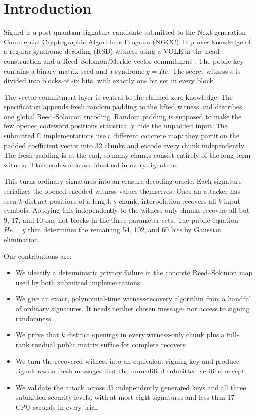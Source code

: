 \documentclass[11pt,a4paper]{article}
\begin{document}
\section{Introduction}

Sigurd is a post-quantum signature candidate submitted to the
Next-generation Commercial Cryptographic Algorithms Program (NGCC).  It proves
knowledge of a regular-syndrome-decoding (RSD) witness using a
VOLE-in-the-head construction and a Reed--Solomon/Merkle vector commitment
\cite{Sigurd}.  The public key contains a binary matrix seed and a syndrome
$y=He$.  The secret witness $e$ is divided into blocks of six bits, with
exactly one bit set in every block.

The vector-commitment layer is central to the claimed zero knowledge.  The
specification appends fresh random padding to the lifted witness and describes
one global Reed--Solomon encoding.  Random padding is supposed to make the few
opened codeword positions statistically hide the unpadded input.  The
submitted C implementations use a different concrete map: they partition the
padded coefficient vector into 32 chunks and encode every chunk independently.
The fresh padding is at the end, so many chunks consist entirely of the
long-term witness.  Their codewords are identical in every signature.

This turns ordinary signatures into an erasure-decoding oracle.  Each
signature serializes the opened encoded-witness values themselves.  Once an
attacker has seen $k$ distinct positions of a length-$s$ chunk, interpolation
recovers all $k$ input symbols.  Applying this independently to the
witness-only chunks recovers all but 9, 17, and 10 one-hot blocks in the three
parameter sets.  The public equation $He=y$ then determines the remaining 54,
102, and 60 bits by Gaussian elimination.

Our contributions are:

\begin{itemize}[leftmargin=1.5em]
  \item We identify a deterministic privacy failure in the concrete
        Reed--Solomon map used by both submitted implementations.
  \item We give an exact, polynomial-time witness-recovery algorithm from a
        handful of ordinary signatures.  It needs neither chosen messages nor
        access to signing randomness.
  \item We prove that $k$ distinct openings in every witness-only chunk plus a
        full-rank residual public matrix suffice for complete recovery.
  \item We turn the recovered witness into an equivalent signing key and
        produce signatures on fresh messages that the unmodified submitted
        verifiers accept.
  \item We validate the attack across 35 independently generated keys and all
        three submitted security levels, with at most eight signatures and
        less than 17 CPU-seconds in every trial.
\end{itemize}
\end{document}
